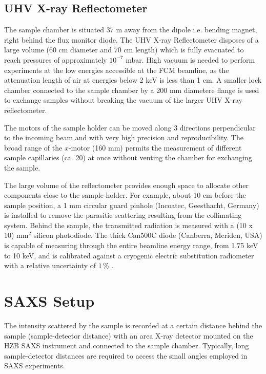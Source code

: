 \subsection{UHV X-ray Reflectometer}

The sample chamber is situated 37 m away from the dipole i.e. bending magnet, right behind the flux monitor diode. The UHV X-ray Reflectometer disposes of a large volume (60 cm diameter and 70 cm length) which is fully evacuated to reach pressures of approximately $10^{-7}$ mbar. High vacuum is needed to perform experiments at the low energies accessible at the FCM beamline, as the attenuation length of air at energies below 2 keV is less than 1 cm. A smaller lock chamber connected to the sample chamber by a 200 mm diametere flange is used to exchange samples without breaking the vacuum of the larger UHV X-ray reflectometer.

The motors of the sample holder can be moved along 3 directions perpendicular to the incoming beam and with very high precision and reproducibility. The broad range of the $x$-motor (160 mm) permits the measurement of different sample capillaries (ca. 20) at once without venting the chamber for exchanging the sample.

The large volume of the reflectometer provides enough space to allocate other components close to the sample holder. For example, about 10 cm before the sample position, a 1 mm circular guard pinhole (Incoatec, Geesthacht, Germany) is installed to remove the parasitic scattering resulting from the collimating system. Behind the sample, the transmitted radiation is measured with a (10 x 10) mm$^2$ silicon photodiode. The thick Can500C diode (Canberra, Meriden, USA) is capable of measuring through the entire beamline energy range, from 1.75 keV to 10 keV, and is calibrated against a cryogenic electric substitution radiometer with a relative uncertainty of \( 1\,\% \) \citep{krumrey_high-accuracy_2001}.

\section{SAXS Setup}
\label{sec:SAXS_experimental}

The intensity scattered by the sample is recorded at a certain distance behind the sample (sample-detector distance) with an area X-ray detector mounted on the HZB SAXS instrument and connected to the sample chamber. Typically, long sample-detector distances are required to access the small angles employed in SAXS experiments.

